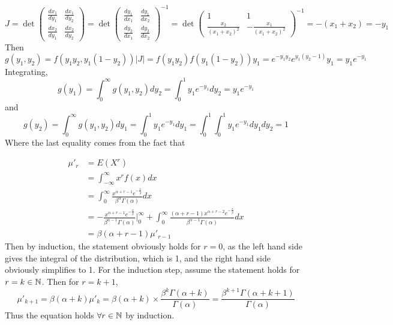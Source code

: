 \documentclass[answers]{exam}
\begin{document}
\begin{questions}
\begin{solution}
	$$J  = \det\begin{pmatrix} \frac{dx_1}{dy_1} & \frac{dx_1}{dy_2} \\ \frac{dx_2}{dy_1} & \frac{dx_2}{dy_2} \end{pmatrix} = \det\begin{pmatrix} \frac{dy_1}{dx_1} & \frac{dy_1}{dx_2} \\ \frac{dy_2}{dx_1} & \frac{dy_2}{dx_2} \end{pmatrix}^{-1} = \det\begin{pmatrix} 1 & 1 \\ \frac{x_2}{(x_1+x_2)^2} & -\frac{x_1}{(x_1+x_2)^2} \end{pmatrix}^{-1} = -(x_1+x_2) = -y_1$$
	Then
	$$g(y_1,y_2) = f(y_1y_2, y_1(1-y_2))|J| = f(y_1y_2)f(y_1(1-y_2))y_1 = e^{-y_1y_2}e^{y_1(y_2-1)}y_1 = y_1e^{-y_1}$$
	Integrating,
	$$g(y_1) = \int_0^\infty g(y_1,y_2)dy_2 = \int_0^1 y_1e^{-y_1}dy_2 = y_1e^{-y_1}$$
	and
	$$g(y_2) = \int_0^\infty g(y_1,y_2)dy_1 = \int_0^1 y_1e^{-y_1}dy_1 = \int_0^1 \int_0^1 y_1e^{-y_1}dy_1dy_2 = 1$$
	Where the last equality comes from the fact that 
\end{solution}


\begin{solution}
	\begin{align*}
		\mu'_r &= E(X^r) \\
		       &= \int_{-\infty}^\infty x^rf(x)dx \\
		       &= \int_0^\infty \frac{x^{\alpha+r-1}e^{-\frac{x}{\beta}}}{\beta^\alpha\Gamma(\alpha)} dx \\
		       &= -\frac{x^{\alpha+r-1}e^{-\frac{x}{\beta}}}{\beta^{\alpha-1}\Gamma(\alpha)} \Big |_0^\infty + \int_0^\infty \frac{(\alpha+r-1)x^{\alpha+r-2}e^{-\frac{x}{\beta}}}{\beta^{\alpha-1}\Gamma(\alpha)} dx \\
		       &= \beta(\alpha+r-1)\mu'_{r-1}
	\end{align*}
	Then by induction, the statement obviously holds for $r=0$, as the left hand side gives the integral of the distribution, which is 1, and the right hand side obviously simplifies to 1. For the induction step, assume the statement holds for $r=k \in \mathbb{N}$. Then for $r=k+1$,
	$$\mu'_{k+1} = \beta(\alpha+k)\mu'_k = \beta(\alpha+k)\times\frac{\beta^k\Gamma(\alpha+k)}{\Gamma(\alpha)} = \frac{\beta^{k+1}\Gamma(\alpha+k+1)}{\Gamma(\alpha)}$$
	Thus the equation holds $\forall r \in \mathbb{N}$ by induction.
\end{solution}


\end{questions}
\end{document}
